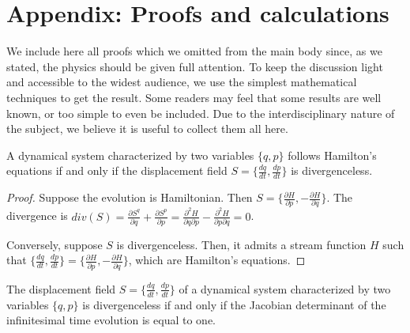 \documentclass[10pt,twocolumn, nofootinbib]{revtex4-2}
\begin{document}
\section*{Appendix: Proofs and calculations}

We include here all proofs which we omitted from the main body since, as we stated, the physics should be given full attention. To keep the discussion light and accessible to the widest audience, we use the simplest mathematical techniques to get the result. Some readers may feel that some results are well known, or too simple to even be included. Due to the interdisciplinary nature of the subject, we believe it is useful to collect them all here.

\begin{prop}
	A dynamical system characterized by two variables $\{q, p\}$ follows Hamilton's equations if and only if the displacement field $S=\{\frac{dq}{dt}, \frac{dp}{dt} \}$ is divergenceless.
\end{prop}

\begin{proof}
	Suppose the evolution is Hamiltonian. Then $S=\{\frac{\partial H}{\partial p}, - \frac{\partial H}{\partial q} \}$. The divergence is $div(S) = \frac{\partial S^q}{\partial q} + \frac{\partial S^p}{\partial p} = \frac{\partial^2 H}{\partial q\partial p} - \frac{\partial^2H}{\partial p\partial q} = 0$.
	
	Conversely, suppose $S$ is divergenceless. Then, it admits a stream function $H$ such that $\{\frac{dq}{dt}, \frac{dp}{dt}\} = \{\frac{\partial H}{\partial p}, - \frac{\partial H}{\partial q} \}$, which are Hamilton's equations.
\end{proof}

\begin{prop}
	The displacement field $S=\{\frac{dq}{dt}, \frac{dp}{dt} \}$ of a dynamical system characterized by two variables $\{q, p\}$ is divergenceless if and only if the Jacobian determinant of the infinitesimal time evolution is equal to one.
\end{prop}
\end{document}
